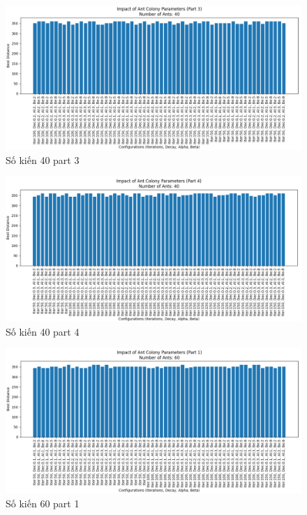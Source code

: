 \documentclass[14pt]{article}
\begin{document}
\begin{center}
		\begin{figure}[htbp]
			\centering
			\includegraphics[width=\textwidth]{./Image/40_part3.png}
			\caption{Số kiến 40 part 3}
			\label{fig:mylabel}
		\end{figure}
		\begin{figure}[htbp]
			\centering
			\includegraphics[width=\textwidth]{./Image/40_part4.png}
			\caption{Số kiến 40 part 4}
			\label{fig:mylabel}
		\end{figure}
		\begin{figure}[htbp]
			\centering
			\includegraphics[width=\textwidth]{./Image/60_part1.png}
			\caption{Số kiến 60 part 1}
			\label{fig:mylabel}
		\end{figure}
		

\end{center}
\end{document}
